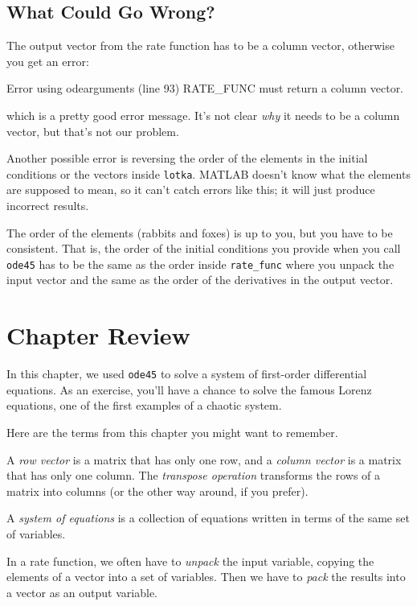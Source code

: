 

\subsection{What Could Go Wrong?}

The output vector from the rate function has to be a column vector, otherwise you get an error:

\begin{code}
Error using odearguments (line 93)
RATE_FUNC must return a column vector.
\end{code}
which is a pretty good error message.  It's not clear \emph{why}
it needs to be a column vector, but that's not our problem.


Another possible error is reversing the order of the elements in the
initial conditions or the vectors inside \lstinline{lotka}.  MATLAB
doesn't know what the elements are supposed to mean, so it can't catch
errors like this; it will just produce incorrect results.

The order of the elements (rabbits and foxes) is up to you, but
you have to be consistent.  That is, the order of the initial conditions you
provide when you call \lstinline{ode45} has to be the same as the order
inside \lstinline{rate_func} where you unpack the input vector and the
same as the order of the derivatives in the output vector.

\section{Chapter Review}

In this chapter, we used \lstinline{ode45} to solve a system of first-order differential equations.
As an exercise, you'll have a chance to solve the famous Lorenz equations, one of the first examples of a chaotic system.

Here are the terms from this chapter you might want to remember.

A \emph{row vector} is a matrix that has only one row, and a \emph{column vector} is a matrix that has only one column.
The \emph{transpose operation} transforms the  rows of a matrix
into columns (or the other way around, if you prefer).

A \emph{system of equations} is a collection of equations written in terms of
the same set of variables.

In a rate function, we often have to \emph{unpack} the input variable,
copying the elements of a vector into a set of variables.
Then we have to \emph{pack} the results into a vector as an output variable.

